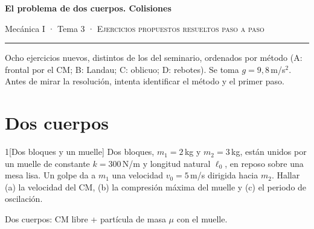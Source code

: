 \documentclass[11pt,a4paper,twoside]{article}
\newcommand{\metodo}[1]{{\color{tenue}\small\sffamily #1}\par\nopagebreak}
\begin{document}
\thispagestyle{plain}
\begin{center}
{\Large\bfseries El problema de dos cuerpos. Colisiones\par}
\vspace{1.2mm}
{\small\color{tenue}Mecánica I · Tema 3 · \textsc{Ejercicios propuestos resueltos paso a paso}\par}
\vspace{2mm}
{\color{regla}\rule{0.35\textwidth}{0.4pt}}
\end{center}

Ocho ejercicios nuevos, distintos de los del seminario, ordenados por método (A: frontal por el
CM; B: Landau; C: oblicuo; D: rebotes). Se toma $g=9{,}8$\,m/s$^{2}$. Antes de mirar la
resolución, intenta identificar el método y el primer paso.

\section{Dos cuerpos}

\begin{problema}{1}[Dos bloques y un muelle]
Dos bloques, $m_{1}=2$\,kg y $m_{2}=3$\,kg, están unidos por un muelle de constante $k=300$\,N/m
y longitud natural $\ell_{0}$, en reposo sobre una mesa lisa. Un golpe da a $m_{1}$ una velocidad
$v_{0}=5$\,m/s dirigida hacia $m_{2}$. Hallar (a) la velocidad del CM, (b) la compresión
máxima del muelle y (c) el periodo de oscilación.
\end{problema}
\metodo{Dos cuerpos: CM libre + partícula de masa $\mu$ con el muelle.}
\end{document}
